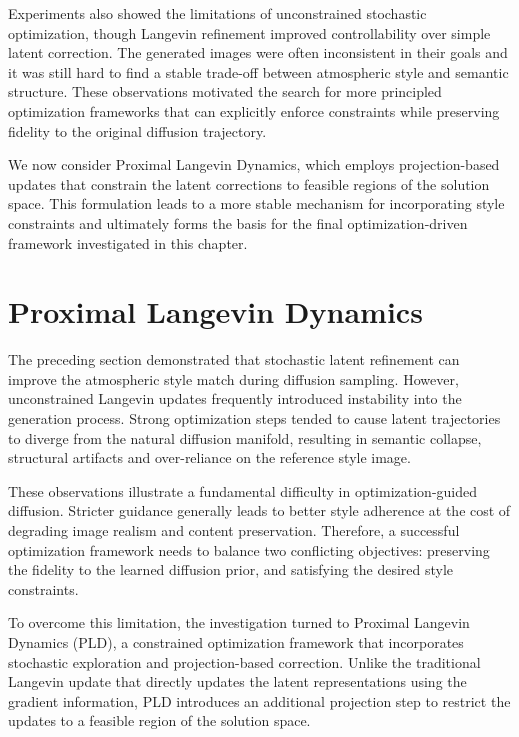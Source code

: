 Experiments also showed the limitations of unconstrained stochastic optimization, though Langevin refinement improved controllability over simple latent correction. The generated images were often inconsistent in their goals and it was still hard to find a stable trade-off between atmospheric style and semantic structure. These observations motivated the search for more principled optimization frameworks that can explicitly enforce constraints while preserving fidelity to the original diffusion trajectory.

We now consider Proximal Langevin Dynamics, which employs projection-based updates that constrain the latent corrections to feasible regions of the solution space. This formulation leads to a more stable mechanism for incorporating style constraints and ultimately forms the basis for the final optimization-driven framework investigated in this chapter.

\FloatBarrier
\section{Proximal Langevin Dynamics}
\label{sec:ch7_pld}

The preceding section demonstrated that stochastic latent refinement can improve the atmospheric style match during diffusion sampling. However, unconstrained Langevin updates frequently introduced instability into the generation process. Strong optimization steps tended to cause latent trajectories to diverge from the natural diffusion manifold, resulting in semantic collapse, structural artifacts and over-reliance on the reference style image.

These observations illustrate a fundamental difficulty in optimization-guided diffusion. Stricter guidance generally leads to better style adherence at the cost of degrading image realism and content preservation. Therefore, a successful optimization framework needs to balance two conflicting objectives: preserving the fidelity to the learned diffusion prior, and satisfying the desired style constraints.

To overcome this limitation, the investigation turned to Proximal Langevin Dynamics (PLD), a constrained optimization framework that incorporates stochastic exploration and projection-based correction. Unlike the traditional Langevin update that directly updates the latent representations using the gradient information, PLD introduces an additional projection step to restrict the updates to a feasible region of the solution space.

